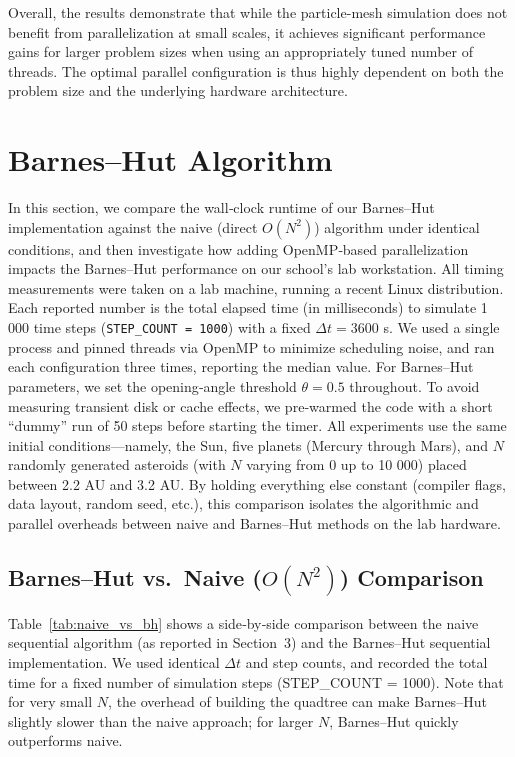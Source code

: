 \documentclass{article}
\begin{document}
Overall, the results demonstrate that while the particle-mesh simulation does not benefit from parallelization at small scales, it achieves significant performance gains for larger problem sizes when using an appropriately tuned number of threads. The optimal parallel configuration is thus highly dependent on both the problem size and the underlying hardware architecture.


\section{Barnes–Hut Algorithm}

\noindent
In this section, we compare the wall‐clock runtime of our Barnes–Hut implementation against the naive (direct \(O(N^2)\)) algorithm under identical conditions, and then investigate how adding OpenMP‐based parallelization impacts the Barnes–Hut performance on our school’s lab workstation. All timing measurements were taken on a lab machine, running a recent Linux distribution. Each reported number is the total elapsed time (in milliseconds) to simulate 1 000 time steps (\texttt{STEP\_COUNT = 1000}) with a fixed \(\Delta t = 3600\) s. We used a single process and pinned threads via OpenMP to minimize scheduling noise, and ran each configuration three times, reporting the median value. For Barnes–Hut parameters, we set the opening‐angle threshold \(\theta = 0.5\) throughout. To avoid measuring transient disk or cache effects, we pre‐warmed the code with a short “dummy” run of 50 steps before starting the timer. All experiments use the same initial conditions—namely, the Sun, five planets (Mercury through Mars), and \(N\) randomly generated asteroids (with \(N\) varying from 0 up to 10 000) placed between 2.2 AU and 3.2 AU. By holding everything else constant (compiler flags, data layout, random seed, etc.), this comparison isolates the algorithmic and parallel overheads between naive and Barnes–Hut methods on the lab hardware.


\subsection{Barnes–Hut vs.\ Naive ($O(N^2)$) Comparison}

Table~\ref{tab:naive_vs_bh} shows a side‐by‐side comparison between the naive sequential algorithm (as reported in Section~3) and the Barnes–Hut sequential implementation.  We used identical $\Delta t$ and step counts, and recorded the total time for a fixed number of simulation steps (STEP\_COUNT = 1000).  Note that for very small $N$, the overhead of building the quadtree can make Barnes–Hut slightly slower than the naive approach; for larger $N$, Barnes–Hut quickly outperforms naive.
\end{document}
